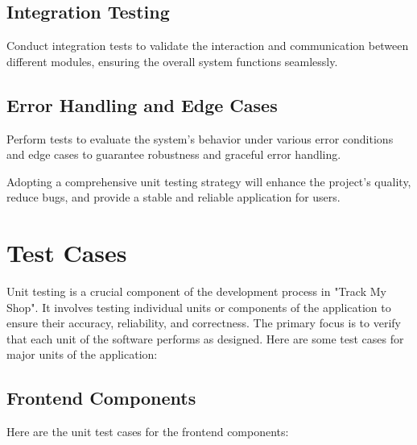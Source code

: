 \subsection{Integration Testing} Conduct integration tests to validate the interaction and communication between different modules, ensuring the overall system functions seamlessly.
	
\subsection{Error Handling and Edge Cases} Perform tests to evaluate the system's behavior under various error conditions and edge cases to guarantee robustness and graceful error handling.


Adopting a comprehensive unit testing strategy will enhance the project's quality, reduce bugs, and provide a stable and reliable application for users.

\section{Test Cases}
Unit testing is a crucial component of the development process in "Track My Shop". It involves testing individual units or components of the application to ensure their accuracy, reliability, and correctness. The primary focus is to verify that each unit of the software performs as designed. Here are some test cases for major units of the application:

\pagebreak

\subsection{Frontend Components}
Here are the unit test cases for the frontend components:	

\textbf{\\}
\textbf{\\}


